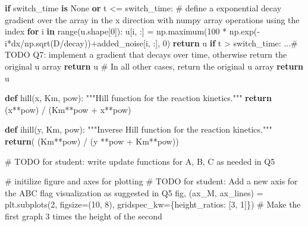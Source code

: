 \documentclass[
  letterpaper,
  DIV=11,
  numbers=noendperiod]{scrreprt}
\newenvironment{Shaded}{\begin{snugshade}}{\end{snugshade}}
\newcommand{\AlertTok}[1]{\textcolor[rgb]{0.68,0.00,0.00}{#1}}
\newcommand{\BuiltInTok}[1]{\textcolor[rgb]{0.00,0.23,0.31}{#1}}
\newcommand{\CommentTok}[1]{\textcolor[rgb]{0.37,0.37,0.37}{#1}}
\newcommand{\ControlFlowTok}[1]{\textcolor[rgb]{0.00,0.23,0.31}{\textbf{#1}}}
\newcommand{\DecValTok}[1]{\textcolor[rgb]{0.68,0.00,0.00}{#1}}
\newcommand{\KeywordTok}[1]{\textcolor[rgb]{0.00,0.23,0.31}{\textbf{#1}}}
\newcommand{\NormalTok}[1]{\textcolor[rgb]{0.00,0.23,0.31}{#1}}
\newcommand{\OperatorTok}[1]{\textcolor[rgb]{0.37,0.37,0.37}{#1}}
\newcommand{\StringTok}[1]{\textcolor[rgb]{0.13,0.47,0.30}{#1}}
\newcommand{\VariableTok}[1]{\textcolor[rgb]{0.07,0.07,0.07}{#1}}
\theoremstyle{definition}
\theoremstyle{remark}
\begin{document}
\begin{tcolorbox}
\begin{Shaded}
\begin{Highlighting}[]
    \ControlFlowTok{if}\NormalTok{ switch\_time }\KeywordTok{is} \VariableTok{None} \KeywordTok{or}\NormalTok{ t }\OperatorTok{\textless{}=}\NormalTok{ switch\_time:}
        \CommentTok{\# define a exponential decay gradient over the array in the x direction with numpy array operations using the index}
        \ControlFlowTok{for}\NormalTok{ i }\KeywordTok{in} \BuiltInTok{range}\NormalTok{(u.shape[}\DecValTok{0}\NormalTok{]):}
\NormalTok{            u[i, :] }\OperatorTok{=}\NormalTok{ np.maximum(}\DecValTok{100} \OperatorTok{*}\NormalTok{ np.exp(}\OperatorTok{{-}}\NormalTok{i}\OperatorTok{*}\NormalTok{dx}\OperatorTok{/}\NormalTok{np.sqrt(D}\OperatorTok{/}\NormalTok{decay))}\OperatorTok{+}\NormalTok{added\_noise[i, :], }\DecValTok{0}\NormalTok{)}
        \ControlFlowTok{return}\NormalTok{ u}
    \ControlFlowTok{if}\NormalTok{ t }\OperatorTok{\textgreater{}}\NormalTok{ switch\_time:}
\NormalTok{        ...}\CommentTok{\# }\AlertTok{TODO}\CommentTok{ Q7: implement a gradient that decays over time, otherwise return the original u array}
        \ControlFlowTok{return}\NormalTok{ u}
    \CommentTok{\# In all other cases, return the original u array        }
    \ControlFlowTok{return}\NormalTok{ u}

\KeywordTok{def}\NormalTok{ hill(x, Km, }\BuiltInTok{pow}\NormalTok{):}
    \CommentTok{"""Hill function for the reaction kinetics."""}
    \ControlFlowTok{return}\NormalTok{ (x}\OperatorTok{**}\BuiltInTok{pow}\NormalTok{) }\OperatorTok{/}\NormalTok{ (Km}\OperatorTok{**}\BuiltInTok{pow} \OperatorTok{+}\NormalTok{ x}\OperatorTok{**}\BuiltInTok{pow}\NormalTok{) }

\KeywordTok{def}\NormalTok{ ihill(y, Km, }\BuiltInTok{pow}\NormalTok{):}
    \CommentTok{"""Inverse Hill function for the reaction kinetics."""}
    \ControlFlowTok{return}\NormalTok{( (Km}\OperatorTok{**}\BuiltInTok{pow}\NormalTok{) }\OperatorTok{/}\NormalTok{ (y }\OperatorTok{**}\BuiltInTok{pow}  \OperatorTok{+}\NormalTok{ Km}\OperatorTok{**}\BuiltInTok{pow}\NormalTok{))}

\CommentTok{\# }\AlertTok{TODO}\CommentTok{ for student: write update functions for A, B, C as needed in Q5}


\CommentTok{\# initilize figure and axes for plotting}
\CommentTok{\# }\AlertTok{TODO}\CommentTok{ for student: Add a new axis for the ABC flag visualization as suggested in Q5}
\NormalTok{fig, (ax\_M, ax\_lines) }\OperatorTok{=}\NormalTok{ plt.subplots(}\DecValTok{2}\NormalTok{, figsize}\OperatorTok{=}\NormalTok{(}\DecValTok{10}\NormalTok{, }\DecValTok{8}\NormalTok{), gridspec\_kw}\OperatorTok{=}\NormalTok{\{}\StringTok{\textquotesingle{}height\_ratios\textquotesingle{}}\NormalTok{: [}\DecValTok{3}\NormalTok{, }\DecValTok{1}\NormalTok{]\})  }\CommentTok{\# Make the first graph 3 times the height of the second}


\end{Highlighting}
\end{Shaded}
\end{tcolorbox}
\end{document}
